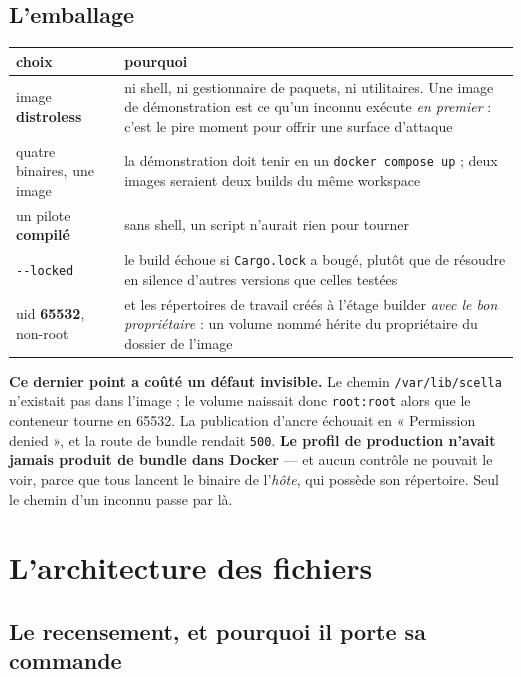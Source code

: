 \documentclass[10pt]{report}
\newcommand{\code}[1]{\texttt{\small #1}}
\newcommand{\att}[1]{\textcolor{amber}{\textbf{#1}}}
\begin{document}
\section{L'emballage}

\begin{longtable}{@{}p{4.0cm} p{11.0cm}@{}}
\toprule \textbf{choix} & \textbf{pourquoi} \\ \midrule \endhead
image \textbf{distroless} & ni shell, ni gestionnaire de paquets, ni utilitaires. Une image de démonstration est ce qu'un inconnu exécute \emph{en premier} : c'est le pire moment pour offrir une surface d'attaque \\
quatre binaires, une image & la démonstration doit tenir en un \code{docker compose up} ; deux images seraient deux builds du même workspace \\
un pilote \textbf{compilé} & sans shell, un script n'aurait rien pour tourner \\
\code{-{}-locked} & le build échoue si \code{Cargo.lock} a bougé, plutôt que de résoudre en silence d'autres versions que celles testées \\
uid \textbf{65532}, non-root & et les répertoires de travail créés à l'étage builder \emph{avec le bon propriétaire} : un volume nommé hérite du propriétaire du dossier de l'image \\
\bottomrule
\end{longtable}

\att{Ce dernier point a coûté un défaut invisible.} Le chemin \code{/var/lib/scella} n'existait pas
dans l'image ; le volume naissait donc \code{root:root} alors que le conteneur tourne en 65532. La
publication d'ancre échouait en « Permission denied », et la route de bundle rendait \code{500}.
\textbf{Le profil de production n'avait jamais produit de bundle dans Docker} --- et aucun contrôle
ne pouvait le voir, parce que tous lancent le binaire de l'\emph{hôte}, qui possède son répertoire.
Seul le chemin d'un inconnu passe par là.


\chapter{L'architecture des fichiers}
\label{ch:archi}

\section{Le recensement, et pourquoi il porte sa commande}
\end{document}
